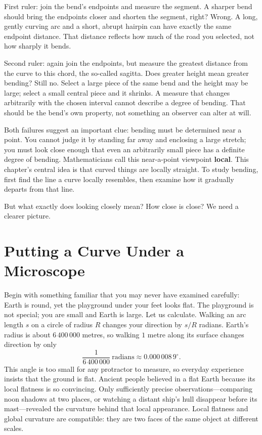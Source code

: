 First ruler: join the bend's endpoints and measure the segment. A sharper bend should bring the endpoints closer and shorten the segment, right? Wrong. A long, gently curving arc and a short, abrupt hairpin can have exactly the same endpoint distance. That distance reflects how much of the road you selected, not how sharply it bends.

Second ruler: again join the endpoints, but measure the greatest distance from the curve to this chord, the so-called sagitta. Does greater height mean greater bending? Still no. Select a large piece of the same bend and the height may be large; select a small central piece and it shrinks. A measure that changes arbitrarily with the chosen interval cannot describe a degree of bending. That should be the bend's own property, not something an observer can alter at will.

Both failures suggest an important clue: bending must be determined near a point. You cannot judge it by standing far away and enclosing a large stretch; you must look close enough that even an arbitrarily small piece has a definite degree of bending. Mathematicians call this near-a-point viewpoint \textbf{local}. This chapter's central idea is that curved things are locally straight. To study bending, first find the line a curve locally resembles, then examine how it gradually departs from that line.

But what exactly does looking closely mean? How close is close? We need a clearer picture.

\section{Putting a Curve Under a Microscope}

Begin with something familiar that you may never have examined carefully: Earth is round, yet the playground under your feet looks flat. The playground is not special; you are small and Earth is large. Let us calculate. Walking an arc length $s$ on a circle of radius $R$ changes your direction by $s/R$ radians. Earth's radius is about $6\,400\,000$ metres, so walking $1$ metre along its surface changes direction by only
\[
\frac{1}{6\,400\,000}\ \text{radians} \approx 0.000\,008\,9^\circ.
\]
This angle is too small for any protractor to measure, so everyday experience insists that the ground is flat. Ancient people believed in a flat Earth because its local flatness is so convincing. Only sufficiently precise observations---comparing noon shadows at two places, or watching a distant ship's hull disappear before its mast---revealed the curvature behind that local appearance. Local flatness and global curvature are compatible: they are two faces of the same object at different scales.

